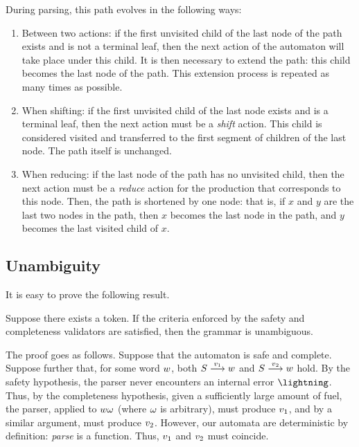 \documentclass{llncs}
\begin{document}
During parsing, this path evolves in the following ways:
\begin{enumerate}
\item Between two actions: if the first unvisited child
  of the last node of the path exists and is not a terminal leaf, then the
  next action of the automaton will take place under this child. It is then
  necessary to extend the path: this child becomes the last node of the
  path. This extension process is repeated as many times as possible.
\item When shifting: if the first unvisited child of the last node exists and is a terminal leaf, then
  the next action must be a \textit{shift} action. This child is considered
  visited and transferred to the first segment of children of the last node.
  The path itself is unchanged. %
\item When reducing: if the last node of the path has no unvisited child,
  then the next action must be a \textit{reduce} action for the production
  that corresponds to this node. Then, the path is shortened by one node:
  that is, if $x$ and $y$ are the last two nodes in the path, then $x$
  becomes the last node in the path, and $y$ becomes the last visited child of $x$.
\end{enumerate}


\subsection{Unambiguity}

It is easy to prove the following result.

\begin{theorem}
  Suppose there exists a token.
  If the criteria enforced by the safety and completeness validators are
  satisfied, then the grammar is unambiguous.
\end{theorem}

The proof goes as follows.
%
Suppose that the automaton is safe and complete. Suppose further that, for
some word $w$, both $S\stackrel{v_1}{\longrightarrow}w$ and $S\stackrel{v_2}{\longrightarrow}w$
hold. By the safety hypothesis, the parser never encounters an internal error
$\Err$. Thus, by the completeness hypothesis, given a sufficiently large
amount of fuel, the parser, applied to $w\omega$ (where $\omega$ is
arbitrary), must produce $v_1$, and by a similar argument, must produce
$v_2$. However, our automata are deterministic by definition: \textit{parse}
is a function. Thus, $v_1$ and $v_2$ must coincide.
\end{document}
